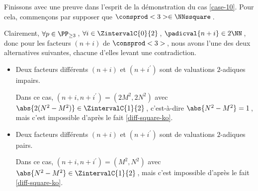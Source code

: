 Finissons avec une preuve dans l'esprit de la démonstration du cas \ref{case-10}.
Pour cela, commençons par supposer que $\consprod<3> \in \NNssquare$\,.

\smallskip
    
Clairement, 
$\forall p \in \PP_{\geq 3}$\,, 
$\forall i \in \ZintervalC{0}{2}$\,, 
$\padicval{n + i} \in 2 \NN$\,,
donc pour les facteurs $(n + i)$ de $\consprod<3>$\,, nous avons l'une des deux alternatives suivantes, chacune d'elles levant une contradiction.
%
\begin{itemize}
	\medskip
	\item Deux facteurs différents $(n+i)$ et $(n+i^\prime)$ sont de valuations $2$-adiques impairs.
		
	\smallskip
	\noindent
	Dans ce cas, $(n+i, n+i^\prime) = (2 M^2, 2 N^2)$ avec $\abs{2(N^2 - M^2)} \in \ZintervalC{1}{2}$\,, c'est-à-dire $\abs{N^2 - M^2} = 1$\,, mais c'est impossible d'après le fait \ref{diff-square-ko}.


	\medskip
	\item Deux facteurs différents $(n+i)$ et $(n+i^\prime)$ sont de valuations $2$-adiques pairs.

	\smallskip
	\noindent
	Dans ce cas, $(n+i, n+i^\prime) = (M^2, N^2)$ avec $\abs{N^2 - M^2} \in \ZintervalC{1}{2}$\,, mais c'est impossible d'après le fait \ref{diff-square-ko}.
	\qedhere
\end{itemize}